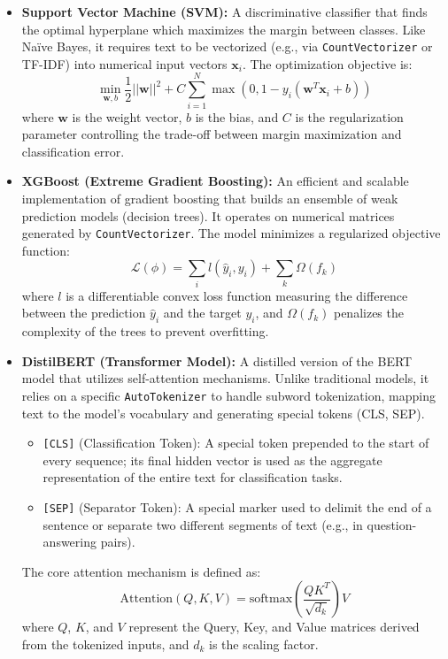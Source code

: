 \documentclass[11pt,a4paper]{article}
\begin{document}
\begin{itemize}
    \item \textbf{Support Vector Machine (SVM):} 
    A discriminative classifier that finds the optimal hyperplane which maximizes the margin between classes. Like Na\"ive Bayes, it requires text to be vectorized (e.g., via \texttt{CountVectorizer} or TF-IDF) into numerical input vectors $\mathbf{x}_i$. The optimization objective is:
    \begin{equation}
        \min_{\mathbf{w}, b} \frac{1}{2} ||\mathbf{w}||^2 + C \sum_{i=1}^{N} \max(0, 1 - y_i(\mathbf{w}^T \mathbf{x}_i + b))
    \end{equation}
    where $\mathbf{w}$ is the weight vector, $b$ is the bias, and $C$ is the regularization parameter controlling the trade-off between margin maximization and classification error. \\

    \item \textbf{XGBoost (Extreme Gradient Boosting):}
    An efficient and scalable implementation of gradient boosting that builds an ensemble of weak prediction models (decision trees). It operates on numerical matrices generated by \texttt{CountVectorizer}. The model minimizes a regularized objective function:
    \begin{equation}
        \mathcal{L}(\phi) = \sum_{i} l(\hat{y}_i, y_i) + \sum_{k} \Omega(f_k)
    \end{equation}
    where $l$ is a differentiable convex loss function measuring the difference between the prediction $\hat{y}_i$ and the target $y_i$, and $\Omega(f_k)$ penalizes the complexity of the trees to prevent overfitting. \\

    \item \textbf{DistilBERT (Transformer Model):} 
    A distilled version of the BERT model that utilizes self-attention mechanisms. Unlike traditional models, it relies on a specific \texttt{AutoTokenizer} to handle subword tokenization, mapping text to the model's vocabulary and generating special tokens (CLS, SEP).\\
\begin{itemize}
    \item \texttt{[CLS]} (Classification Token): A special token prepended to the start of every sequence; its final hidden vector is used as the aggregate representation of the entire text for classification tasks.
    \item \texttt{[SEP]} (Separator Token): A special marker used to delimit the end of a sentence or separate two different segments of text (e.g., in question-answering pairs).
\end{itemize}

The core attention mechanism is defined as:
    \begin{equation}
        \text{Attention}(Q, K, V) = \text{softmax}\left(\frac{QK^T}{\sqrt{d_k}}\right)V
    \end{equation}
    where $Q$, $K$, and $V$ represent the Query, Key, and Value matrices derived from the tokenized inputs, and $d_k$ is the scaling factor.
\end{itemize}
\end{document}
